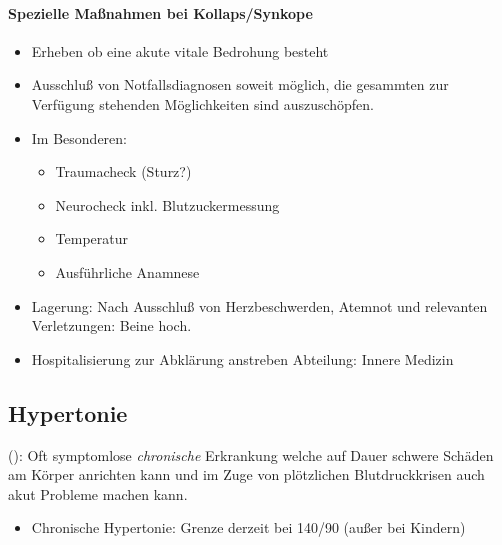 \begin{gMassnahmenEnv}
    \paragraph{Spezielle Maßnahmen bei Kollaps/Synkope}
    
    \begin{itemize}
        \item Erheben ob eine akute vitale Bedrohung besteht
        \item Ausschluß von Notfallsdiagnosen soweit
        möglich, die gesammten zur Verfügung stehenden
        Möglichkeiten sind auszuschöpfen.
        \item Im Besonderen:
        \begin{itemize}
            \item Traumacheck (Sturz?)
            \item Neurocheck inkl. Blutzuckermessung
            \item Temperatur
            \item Ausführliche Anamnese

        \end{itemize}
        
        \item Lagerung: Nach Ausschluß von Herzbeschwerden,
        Atemnot und relevanten Verletzungen: Beine hoch. 
        \item Hospitalisierung zur Abklärung
        anstreben\newline
        Abteilung: Innere Medizin
        
    \end{itemize}
    
\end{gMassnahmenEnv}

\subsection{Hypertonie}

(): Oft
symptomlose \textit{chronische} Erkrankung welche auf Dauer schwere
Schäden am K\"orper anrichten kann und im Zuge von pl\"otzlichen
Blutdruckkrisen auch akut Probleme machen kann. 

\begin{itemize}
    \item Chronische Hypertonie: Grenze derzeit bei 140/90
    (au{\ss}er bei Kindern)
\end{itemize}

